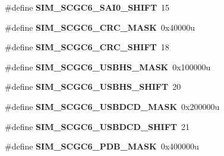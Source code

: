 \begin{DoxyCompactItemize}
\item 
\hypertarget{group___s_i_m___register___masks_gafc7496e3949481f64992414afd304bfa}{}\#define {\bfseries S\+I\+M\+\_\+\+S\+C\+G\+C6\+\_\+\+S\+A\+I0\+\_\+\+S\+H\+I\+F\+T}~15\label{group___s_i_m___register___masks_gafc7496e3949481f64992414afd304bfa}

\item 
\hypertarget{group___s_i_m___register___masks_ga86c274c19f77641dda714eb0cd3fb82f}{}\#define {\bfseries S\+I\+M\+\_\+\+S\+C\+G\+C6\+\_\+\+C\+R\+C\+\_\+\+M\+A\+S\+K}~0x40000u\label{group___s_i_m___register___masks_ga86c274c19f77641dda714eb0cd3fb82f}

\item 
\hypertarget{group___s_i_m___register___masks_gac10c9b2426df8ff8be5656590e5ad323}{}\#define {\bfseries S\+I\+M\+\_\+\+S\+C\+G\+C6\+\_\+\+C\+R\+C\+\_\+\+S\+H\+I\+F\+T}~18\label{group___s_i_m___register___masks_gac10c9b2426df8ff8be5656590e5ad323}

\item 
\hypertarget{group___s_i_m___register___masks_ga8811a55ca66f7ec6655d5e5baac7a538}{}\#define {\bfseries S\+I\+M\+\_\+\+S\+C\+G\+C6\+\_\+\+U\+S\+B\+H\+S\+\_\+\+M\+A\+S\+K}~0x100000u\label{group___s_i_m___register___masks_ga8811a55ca66f7ec6655d5e5baac7a538}

\item 
\hypertarget{group___s_i_m___register___masks_ga00386bb373e580e5a1da08ebd7a3aa3f}{}\#define {\bfseries S\+I\+M\+\_\+\+S\+C\+G\+C6\+\_\+\+U\+S\+B\+H\+S\+\_\+\+S\+H\+I\+F\+T}~20\label{group___s_i_m___register___masks_ga00386bb373e580e5a1da08ebd7a3aa3f}

\item 
\hypertarget{group___s_i_m___register___masks_gaffd5a351cb6080fec607562adabf3d21}{}\#define {\bfseries S\+I\+M\+\_\+\+S\+C\+G\+C6\+\_\+\+U\+S\+B\+D\+C\+D\+\_\+\+M\+A\+S\+K}~0x200000u\label{group___s_i_m___register___masks_gaffd5a351cb6080fec607562adabf3d21}

\item 
\hypertarget{group___s_i_m___register___masks_gae588068f46ee21f080b0a2af46a324c5}{}\#define {\bfseries S\+I\+M\+\_\+\+S\+C\+G\+C6\+\_\+\+U\+S\+B\+D\+C\+D\+\_\+\+S\+H\+I\+F\+T}~21\label{group___s_i_m___register___masks_gae588068f46ee21f080b0a2af46a324c5}

\item 
\hypertarget{group___s_i_m___register___masks_ga794d45b465ceb7b9cc3f1453aeab6d1f}{}\#define {\bfseries S\+I\+M\+\_\+\+S\+C\+G\+C6\+\_\+\+P\+D\+B\+\_\+\+M\+A\+S\+K}~0x400000u\label{group___s_i_m___register___masks_ga794d45b465ceb7b9cc3f1453aeab6d1f}


\end{DoxyCompactItemize}
